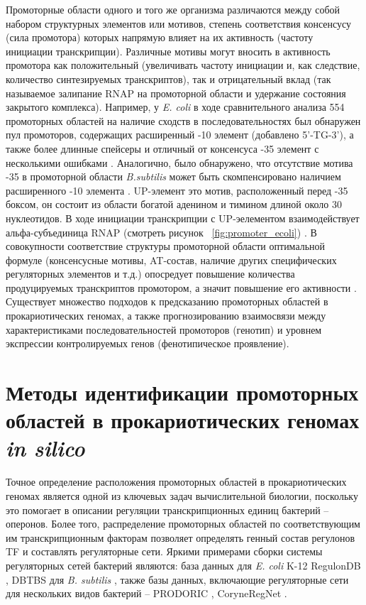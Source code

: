 \documentclass[14pt]{extreport}
\begin{document}
Промоторные области одного и того же организма различаются между собой набором структурных элементов или мотивов, степень соответствия консенсусу (сила промотора) которых напрямую влияет на их активность (частоту инициации транскрипции). Различные мотивы могут вносить в активность промотора как положительный (увеличивать частоту инициации и, как следствие, количество синтезируемых транскриптов), так и отрицательный вклад (так называемое залипание RNAP на промоторной области и удержание состояния закрытого комплекса). Например, у \textit{E. coli} в ходе сравнительного анализа 554 промоторных областей на наличие сходств в последовательностях был обнаружен пул промоторов, содержащих расширенный -10 элемент (добавлено 5'-TG-3'), а также более длинные спейсеры и отличный от консенсуса -35 элемент с несколькими ошибками \cite{mitchell2003identification}. Аналогично, было обнаружено, что отсутствие мотива -35 в промоторной области \textit{B.subtilis} может быть скомпенсировано наличием расширенного -10 элемента \cite{voskuil199816}. UP-элемент это мотив, расположенный перед -35 боксом, он состоит из области богатой аденином и тимином длиной около 30 нуклеотидов. В ходе инициации транскрипции с UP-эелементом взаимодействует альфа-субъединица RNAP (смотреть рисунок ~\ref{fig:promoter_ecoli}) \cite{ross1993third}. В совокупности соответствие структуры промоторной области оптимальной формуле (консенсусные мотивы, AT-состав, наличие других специфических регуляторных элементов и т.д.) опосредует повышение количества продуцируемых транскриптов промотором, а значит повышение его активности \cite{mitchell2003identification}. Существует множество подходов к предсказанию промоторных областей в прокариотических геномах, а также прогнозированию взаимосвязи между характеристиками последовательностей промоторов (генотип) и уровнем экспрессии контролируемых генов (фенотипическое проявление).

\section{Методы идентификации промоторных областей в прокариотических геномах \textit{in silico}}
Точное определение расположения промоторных областей в прокариотических геномах является одной из ключевых задач вычислительной биологии, поскольку это помогает в описании регуляции транскрипционных единиц бактерий -- оперонов. Более того, распределение промоторных областей по соответствующим им транскрипционным факторам позволяет определять генный состав регулонов TF и составлять регуляторные сети. Яркими примерами сборки системы регуляторных сетей бактерий являются: база данных для \textit{E. coli} K-12 RegulonDB \cite{santos2019regulondb}, DBTBS для \textit{B. subtilis} \cite{makita2004dbtbs}, также базы данных, включающие регуляторные сети для нескольких видов бактерий -- PRODORIC \cite{munch2003prodoric}, CoryneRegNet \cite{parise2020coryneregnet}.
\end{document}
